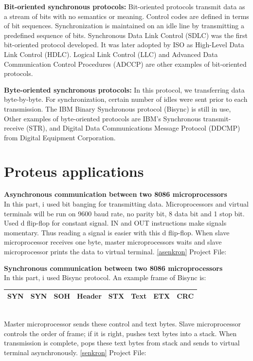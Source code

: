 \documentclass[11pt]{article}
\begin{document}
{\bf Bit-oriented synchronous protocols:} Bit-oriented protocols transmit data as a stream of bits with no semantics or meaning. Control codes are defined in terms of bit sequences. Synchronization is maintained on an idle line by transmitting a predefined sequence of bits. Synchronous Data Link Control (SDLC) was the first bit-oriented protocol developed. It was later adopted by ISO as High-Level Data Link Control (HDLC). Logical Link Control (LLC) and Advanced Data Communication Control Procedures (ADCCP) are other examples of bit-oriented protocols.

{\bf Byte-oriented synchronous protocols:} In this protocol, we transferring data byte-by-byte. For synchronization, certain number of idles were sent prior to each transmission. The IBM Binary Synchronous protocol (Bisync) is still in use, Other examples of byte-oriented protocols are IBM's Synchronous transmit-receive (STR), and Digital Data Communications Message Protocol (DDCMP) from Digital Equipment Corporation. 

\section{Proteus applications}
{\bf Asynchronous communication between two 8086 microprocessors}\\
In this part, i used bit banging for transmitting data. Microprocessors and virtual terminals will be run on 9600 baud rate, no parity bit, 8 data bit and 1 stop bit. Used d flip-flop for constant signal. IN and OUT instructions make signals momentary. Thus reading a signal is easier with this d flip-flop. When slave microprocessor receives one byte, master microprocessors waits and slave microprocessor prints the data to virtual terminal. \ref{asenkron} Project File: 

{\bf Synchronous communication between two 8086 microprocessors}\\
In this part, i used Bisync protocol. An example frame of Bisync is:\\
\begin{tabular} {|c|c| c| c| c| c| c| c| }
 \hline
 SYN & SYN & SOH & Header & STX & Text & ETX & CRC \\
\hline
\end{tabular}\\
Master microprocessor sends these control and text bytes. Slave microprocessor controls the order of frame; if it is right, pushes text bytes into a stack. When transmission is complete, pops these text bytes from stack and sends to virtual terminal asynchronously. \ref{senkron} Project File: 
\end{document}
